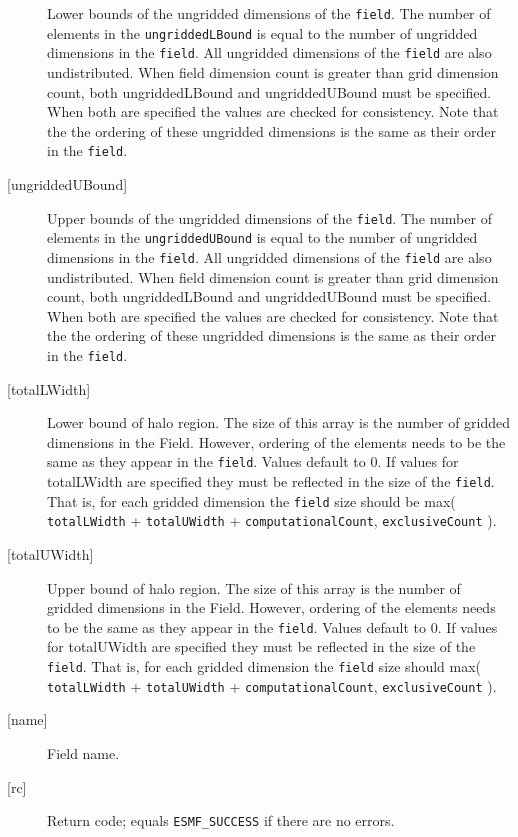 \begin{description}
   Lower bounds of the ungridded dimensions of the {\tt field}.
   The number of elements in the {\tt ungriddedLBound} is equal to the number of ungridded
   dimensions in the {\tt field}. All ungridded dimensions of the
   {\tt field} are also undistributed. When field dimension count is
   greater than grid dimension count, both ungriddedLBound and ungriddedUBound
   must be specified. When both are specified the values are checked
   for consistency. Note that the the ordering of
   these ungridded dimensions is the same as their order in the {\tt field}.
   \item [{[ungriddedUBound]}]
   Upper bounds of the ungridded dimensions of the {\tt field}.
   The number of elements in the {\tt ungriddedUBound} is equal to the number of ungridded
   dimensions in the {\tt field}. All ungridded dimensions of the
   {\tt field} are also undistributed. When field dimension count is
   greater than grid dimension count, both ungriddedLBound and ungriddedUBound
   must be specified. When both are specified the values are checked
   for consistency. Note that the the ordering of
   these ungridded dimensions is the same as their order in the {\tt field}.
   \item [{[totalLWidth]}]
   Lower bound of halo region. The size of this array is the number
   of gridded dimensions in the Field. However, ordering of the elements
   needs to be the same as they appear in the {\tt field}. Values default
   to 0. If values for totalLWidth are specified they must be reflected in
   the size of the {\tt field}. That is, for each gridded dimension the
   {\tt field} size should be max( {\tt totalLWidth} + {\tt totalUWidth}
   + {\tt computationalCount}, {\tt exclusiveCount} ).
   \item [{[totalUWidth]}]
   Upper bound of halo region. The size of this array is the number
   of gridded dimensions in the Field. However, ordering of the elements
   needs to be the same as they appear in the {\tt field}. Values default
   to 0. If values for totalUWidth are specified they must be reflected in
   the size of the {\tt field}. That is, for each gridded dimension the
   {\tt field} size should max( {\tt totalLWidth} + {\tt totalUWidth}
   + {\tt computationalCount}, {\tt exclusiveCount} ).
   \item [{[name]}]
   Field name.
   \item [{[rc]}]
   Return code; equals {\tt ESMF\_SUCCESS} if there are no errors.
   \end{description} 
 
